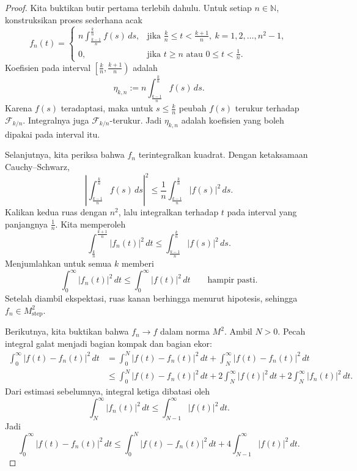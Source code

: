\documentclass[12pt,a4paper]{article}
\theoremstyle{definition}
\theoremstyle{plain}
\newcommand{\N}{\mathbb{N}}
\newcommand{\F}{\mathcal{F}}
\begin{document}
\begin{proof}
  Kita buktikan butir pertama terlebih dahulu. Untuk setiap $n\in\N$,
  konstruksikan proses sederhana acak
  \[
    f_n(t)=
    \begin{cases}
      n\displaystyle\int_{\frac{k-1}{n}}^{\frac{k}{n}} f(s)\,ds,
         & \text{jika }\frac{k}{n}\le t<\frac{k+1}{n},\ k=1,2,\ldots,n^2-1, \\[3mm]
      0, & \text{jika }t\ge n \text{ atau } 0\le t<\frac1n.
    \end{cases}
  \]
  Koefisien pada interval $\left[\frac{k}{n},\frac{k+1}{n}\right)$ adalah
  \[
    \eta_{k,n}:=
    n\int_{\frac{k-1}{n}}^{\frac{k}{n}} f(s)\,ds.
  \]
  Karena $f(s)$ teradaptasi, maka untuk $s\le \frac{k}{n}$ peubah $f(s)$
  terukur terhadap $\F_{k/n}$. Integralnya juga $\F_{k/n}$-terukur. Jadi
  $\eta_{k,n}$ adalah koefisien yang boleh dipakai pada interval itu.

  Selanjutnya, kita periksa bahwa $f_n$ terintegralkan kuadrat. Dengan
  ketaksamaan Cauchy--Schwarz,
  \[
    \left|
    \int_{\frac{k-1}{n}}^{\frac{k}{n}}f(s)\,ds
    \right|^2
    \le
    \frac1n\int_{\frac{k-1}{n}}^{\frac{k}{n}}|f(s)|^2\,ds.
  \]
  Kalikan kedua ruas dengan $n^2$, lalu integralkan terhadap $t$ pada interval
  yang panjangnya $\frac1n$. Kita memperoleh
  \[
    \int_{\frac{k}{n}}^{\frac{k+1}{n}}|f_n(t)|^2\,dt
    \le
    \int_{\frac{k-1}{n}}^{\frac{k}{n}}|f(s)|^2\,ds.
  \]
  Menjumlahkan untuk semua $k$ memberi
  \[
    \int_0^\infty |f_n(t)|^2\,dt
    \le
    \int_0^\infty |f(t)|^2\,dt
    \qquad \text{hampir pasti.}
  \]
  Setelah diambil ekspektasi, ruas kanan berhingga menurut hipotesis, sehingga
  $f_n\in M_{\mathrm{step}}^2$.

  Berikutnya, kita buktikan bahwa $f_n\to f$ dalam norma $M^2$. Ambil $N>0$.
  Pecah integral galat menjadi bagian kompak dan bagian ekor:
  \begin{align*}
    \int_0^\infty |f(t)-f_n(t)|^2\,dt
     & =
    \int_0^N |f(t)-f_n(t)|^2\,dt
    +
    \int_N^\infty |f(t)-f_n(t)|^2\,dt \\
     & \le
    \int_0^N |f(t)-f_n(t)|^2\,dt
    +
    2\int_N^\infty |f(t)|^2\,dt
    +
    2\int_N^\infty |f_n(t)|^2\,dt.
  \end{align*}
  Dari estimasi sebelumnya, integral ketiga dibatasi oleh
  \[
    \int_N^\infty |f_n(t)|^2\,dt
    \le
    \int_{N-1}^\infty |f(t)|^2\,dt.
  \]
  Jadi
  \begin{equation}
    \label{eq:tail-bound}
    \int_0^\infty |f(t)-f_n(t)|^2\,dt
    \le
    \int_0^N |f(t)-f_n(t)|^2\,dt
    +
    4\int_{N-1}^\infty |f(t)|^2\,dt.
  \end{equation}


\end{proof}
\end{document}
